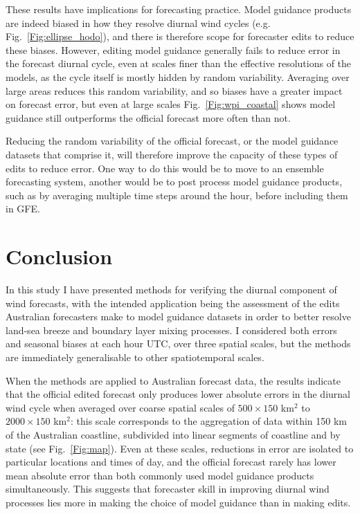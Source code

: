 \documentclass[twocol]{ametsoc}
\begin{document}
These results have implications for forecasting practice. Model guidance products are indeed biased in how they resolve diurnal wind cycles (e.g. Fig.~\ref{Fig:ellipse_hodo}), and there is therefore scope for forecaster edits to reduce these biases. However, editing model guidance generally fails to reduce error in the forecast diurnal cycle, even at scales finer than the effective resolutions of the models, as the cycle itself is mostly hidden by random variability. Averaging over large areas reduces this random variability, and so biases have a greater impact on forecast error, but even at large scales Fig.~\ref{Fig:wpi_coastal} shows model guidance still outperforms the official forecast more often than not. 

Reducing the random variability of the official forecast, or the model guidance datasets that comprise it, will therefore improve the capacity of these types of edits to reduce error. One way to do this would be to move to an ensemble forecasting system, another would be to post process model guidance products, such as by averaging multiple time steps around the hour, before including them in GFE. 

\section{Conclusion}
\label{Sec:Conclusion}
In this study I have presented methods for verifying the diurnal component of wind forecasts, with the intended application being the assessment of the edits Australian forecasters make to model guidance datasets in order to better resolve land-sea breeze and boundary layer mixing processes. I considered both errors and seasonal biases at each hour UTC, over three spatial scales, but the methods are immediately generalisable to other spatiotemporal scales. 

When the methods are applied to Australian forecast data, the results indicate that the official edited forecast only produces lower absolute errors in the diurnal wind cycle when averaged over coarse spatial scales of $500\times 150$ km$^{2}$ to $2000 \times 150$ km$^{2}$: this scale corresponds to the aggregation of data within 150 km of the Australian coastline, subdivided into linear segments of coastline and by state (see Fig.~\ref{Fig:map}). Even at these scales, reductions in error are isolated to particular locations and times of day, and the official forecast rarely has lower mean absolute error than both commonly used model guidance products simultaneously. This suggests that forecaster skill in improving diurnal wind processes lies more in making the choice of model guidance than in making edits.
\end{document}

